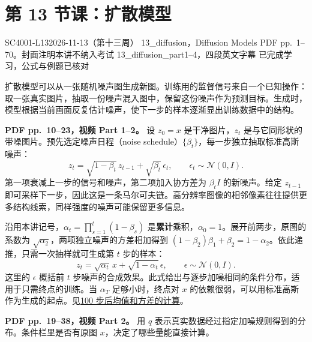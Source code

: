 \begingroup
\renewcommand{\recordid}[1]{}
\renewcommand{\relatedexercise}[2]{\hyperref[exercise:#1]{#2}}
\section{第 13 节课：扩散模型}
\label{lecture:SC4001-L13}
\lecturemeta
  {SC4001-L13}{2026-11-13（第十三周）}
  {13\_diffusion，Diffusion Models}
  {PDF pp.~1--70。封面注明本讲不纳入考试}
  {13\_diffusion\_part1--4，四段英文字幕}
  {已完成学习，公式与例题已核对}

\setlength{\parskip}{0.3em}
\setlength{\abovedisplayskip}{6pt plus 2pt minus 2pt}
\setlength{\belowdisplayskip}{6pt plus 2pt minus 2pt}

扩散模型可以从一张随机噪声图生成新图。训练用的监督信号来自一个已知操作：取一张真实图片，抽取一份噪声混入图中，保留这份噪声作为预测目标。生成时，模型根据当前画面反复估计噪声，使下一步的样本逐渐显出训练数据中的结构。

\textbf{PDF pp.~10--23，视频 Part 1--2。}
设 $z_0=x$ 是干净图片，$z_t$ 是与它同形状的带噪图片。预先选定噪声日程（noise schedule）$\{\beta_t\}$，每一步独立抽取标准高斯噪声：
\[
 z_t=\sqrt{1-\beta_t}\,z_{t-1}+\sqrt{\beta_t}\,\epsilon_t,
 \qquad \epsilon_t\sim\mathcal N(0,I).
\]
第一项衰减上一步的信号和噪声，第二项加入协方差为 $\beta_t I$ 的新噪声。给定 $z_{t-1}$ 即可采样下一步，因此这是一条马尔可夫链。高分辨率图像的相邻像素往往提供更多结构线索，同样强度的噪声可能保留更多信息。

沿用本讲记号，$\alpha_t=\prod_{s=1}^{t}(1-\beta_s)$ 是\textbf{累计}乘积，$\alpha_0=1$。展开前两步，原图的系数为 $\sqrt{\alpha_2}$，两项独立噪声的方差相加得到 $(1-\beta_2)\beta_1+\beta_2=1-\alpha_2$。依此递推，只需一次抽样就可生成第 $t$ 步的样本：
\[
 \boxed{z_t=\sqrt{\alpha_t}\,x+\sqrt{1-\alpha_t}\,\epsilon},
 \qquad \epsilon\sim\mathcal N(0,I).
\]
这里的 $\epsilon$ 概括前 $t$ 步噪声的合成效果。此式给出与逐步加噪相同的条件分布，适用于只需终点的训练。当 $\alpha_T$ 足够小时，终点对 $x$ 的依赖很弱，可以用标准高斯作为生成的起点。见\relatedexercise{SC4001-L13-E01}{100 步后均值和方差的计算}。

\textbf{PDF pp.~19--38，视频 Part 2。}
用 $q$ 表示真实数据经过指定加噪规则得到的分布。条件栏里是否有原图 $x$，决定了哪些量能直接计算。

